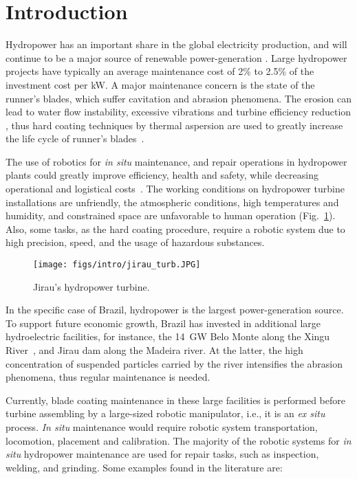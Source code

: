 \section{Introduction}

Hydropower has an important share in the global electricity production, and
will continue to be a major source of renewable power-generation \cite{iea}.
Large hydropower projects have typically an ave\-rage maintenance cost of 2\%
to 2.5\% of the investment cost per kW. A major maintenance concern
is the state of the runner's blades, which suffer cavitation and abrasion
phenomena. The erosion can lead to water flow instability, excessive vibrations
and turbine efficiency reduction \cite{goldemberg2007energia}, thus hard
coating techniques by thermal aspersion are used to greatly increase the life
cycle of runner's blades~\cite{krella2011new}.

The use of robotics for \textit{in situ} maintenance, and repair operations in
hydropower plants could greatly improve efficiency, health and safety, while
decreasing operational and logistical costs~\cite{hazel2012field}. The working
conditions on hydropower turbine installations are unfriendly, the atmospheric
conditions, high temperatures and humidity, and constrained space are
unfavorable to human operation (Fig.~\ref{fig::jirau_turb}). Also, some tasks,
as the hard coating procedure, require a robotic system due to high precision, speed, and the
usage of hazardous substances.

\begin{figure}[h!]
\centering
	\texttt{[image: figs/intro/jirau\_turb.JPG]} 
	\caption{Jirau's hydropower turbine.}
	\label{fig::jirau_turb}
\end{figure}

In the specific case of Brazil, hydropower is the largest
power-generation source. To support future economic growth, Brazil has
invested in additional large hydroelectric facilities, for instance, the
14~GW Belo Monte along the Xingu River~\cite{eia}, and Jirau dam
along the Madeira river. At the latter, the high concentration of suspended
particles carried by the river intensifies the abrasion phenomena, thus
regular maintenance is needed. 

Currently, blade coating maintenance in these large facilities is performed
before turbine assembling by a large-sized robotic manipulator, i.e., it is an
\textit{ex situ} process. \textit{In situ} maintenance would require robotic
system transportation, locomotion, placement and calibration. The majority of
the robotic systems for \textit{in situ} hydropower maintenance are used for
repair tasks, such as inspection, welding, and grinding. Some examples found in
the literature are:

